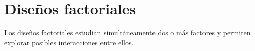 \section{Diseños factoriales}
Los diseños factoriales estudian simultáneamente dos o más factores y permiten explorar posibles interacciones entre ellos.